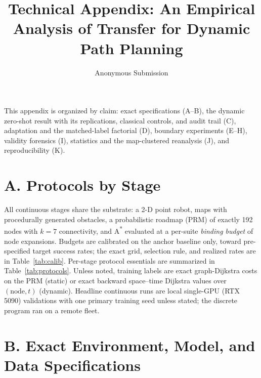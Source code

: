 \documentclass[letterpaper]{article} %
\title{Technical Appendix: An Empirical Analysis of Transfer for Dynamic Path Planning}
\author{Anonymous Submission}
\begin{document}
\maketitle

This appendix is organized by claim: exact specifications (A--B), the dynamic zero-shot result with its replications, classical controls, and audit trail (C), adaptation and the matched-label factorial (D), boundary experiments (E--H), validity forensics (I), statistics and the map-clustered reanalysis (J), and reproducibility (K).

\section{A. Protocols by Stage}

All continuous stages share the substrate: a 2-D point robot, maps with procedurally generated obstacles, a probabilistic roadmap (PRM) of exactly 192 nodes with $k{=}7$ connectivity, and A\textsuperscript{*} evaluated at a per-suite \emph{binding budget} of node expansions. Budgets are calibrated on the anchor baseline only, toward pre-specified target success rates; the exact grid, selection rule, and realized rates are in Table~\ref{tab:calib}. Per-stage protocol essentials are summarized in Table~\ref{tab:protocols}. Unless noted, training labels are exact graph-Dijkstra costs on the PRM (static) or exact backward space--time Dijkstra values over $(\text{node},t)$ (dynamic). Headline continuous runs are local single-GPU (RTX 5090) validations with one primary training seed unless stated; the discrete program ran on a remote fleet.

\section{B. Exact Environment, Model, and Data Specifications}
\end{document}
